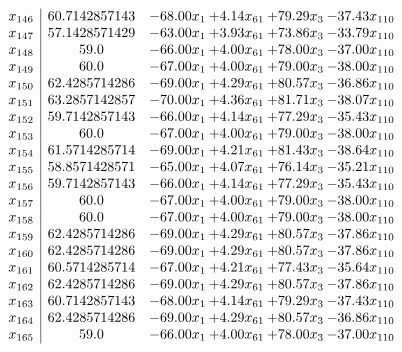 \documentclass[8pt]{article}
\begin{document}
\[\begin{array}{c| c c@{\hskip 2pt} c@{\hskip 2pt} c@{\hskip 2pt} c@{\hskip 2pt} }
 x_{146}   &  60.7142857143 & -68.00 x_{1} & +  4.14 x_{61} & + 79.29 x_{3} & -37.43 x_{110}\\
 x_{147}   &  57.1428571429 & -63.00 x_{1} & +  3.93 x_{61} & + 73.86 x_{3} & -33.79 x_{110}\\
 x_{148}   &  59.0 & -66.00 x_{1} & +  4.00 x_{61} & + 78.00 x_{3} & -37.00 x_{110}\\
 x_{149}   &  60.0 & -67.00 x_{1} & +  4.00 x_{61} & + 79.00 x_{3} & -38.00 x_{110}\\
 x_{150}   &  62.4285714286 & -69.00 x_{1} & +  4.29 x_{61} & + 80.57 x_{3} & -36.86 x_{110}\\
 x_{151}   &  63.2857142857 & -70.00 x_{1} & +  4.36 x_{61} & + 81.71 x_{3} & -38.07 x_{110}\\
 x_{152}   &  59.7142857143 & -66.00 x_{1} & +  4.14 x_{61} & + 77.29 x_{3} & -35.43 x_{110}\\
 x_{153}   &  60.0 & -67.00 x_{1} & +  4.00 x_{61} & + 79.00 x_{3} & -38.00 x_{110}\\
 x_{154}   &  61.5714285714 & -69.00 x_{1} & +  4.21 x_{61} & + 81.43 x_{3} & -38.64 x_{110}\\
 x_{155}   &  58.8571428571 & -65.00 x_{1} & +  4.07 x_{61} & + 76.14 x_{3} & -35.21 x_{110}\\
 x_{156}   &  59.7142857143 & -66.00 x_{1} & +  4.14 x_{61} & + 77.29 x_{3} & -35.43 x_{110}\\
 x_{157}   &  60.0 & -67.00 x_{1} & +  4.00 x_{61} & + 79.00 x_{3} & -38.00 x_{110}\\
 x_{158}   &  60.0 & -67.00 x_{1} & +  4.00 x_{61} & + 79.00 x_{3} & -38.00 x_{110}\\
 x_{159}   &  62.4285714286 & -69.00 x_{1} & +  4.29 x_{61} & + 80.57 x_{3} & -37.86 x_{110}\\
 x_{160}   &  62.4285714286 & -69.00 x_{1} & +  4.29 x_{61} & + 80.57 x_{3} & -37.86 x_{110}\\
 x_{161}   &  60.5714285714 & -67.00 x_{1} & +  4.21 x_{61} & + 77.43 x_{3} & -35.64 x_{110}\\
 x_{162}   &  62.4285714286 & -69.00 x_{1} & +  4.29 x_{61} & + 80.57 x_{3} & -37.86 x_{110}\\
 x_{163}   &  60.7142857143 & -68.00 x_{1} & +  4.14 x_{61} & + 79.29 x_{3} & -37.43 x_{110}\\
 x_{164}   &  62.4285714286 & -69.00 x_{1} & +  4.29 x_{61} & + 80.57 x_{3} & -36.86 x_{110}\\
 x_{165}   &  59.0 & -66.00 x_{1} & +  4.00 x_{61} & + 78.00 x_{3} & -37.00 x_{110}\\

\end{array}\]
\end{document}
